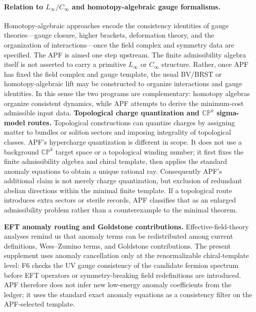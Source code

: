 \documentclass[11pt]{article}
\theoremstyle{definition}
\begin{document}
\paragraph{Relation to $L_\infty/C_\infty$ and homotopy-algebraic gauge formalisms.}\label{par:homotopy_algebra}
Homotopy-algebraic approaches encode the consistency identities of gauge
theories---gauge closure, higher brackets, deformation theory, and the
organization of interactions---once the field complex and symmetry data are
specified.  The APF is aimed one step upstream.  The finite admissibility algebra itself
is not asserted to carry a primitive $L_\infty$ or $C_\infty$ structure.
Rather, once APF has fixed the field complex and gauge template, the usual
BV/BRST or homotopy-algebraic lift may be constructed to organize interactions
and gauge identities.  In this sense the two programs are complementary:
homotopy algebras organize consistent dynamics, while APF attempts to derive
the minimum-cost admissible input data.
\smallskip\noindent\textbf{Topological charge quantization and $\mathbb{CP}^k$ sigma-model routes.}\quad
Topological constructions can quantize charges by assigning matter to bundles or soliton sectors and imposing integrality of topological classes.  APF's hypercharge quantization is different in scope.  It does not use a background $\mathbb{CP}^k$ target space or a topological winding number; it first fixes the finite admissibility algebra and chiral template, then applies the standard anomaly equations to obtain a unique rational ray.  Consequently APF's additional claim is not merely charge quantization, but exclusion of redundant abelian directions within the minimal finite template.  If a topological route introduces extra sectors or sterile records, APF classifies that as an enlarged admissibility problem rather than a counterexample to the minimal theorem.

\smallskip\noindent\textbf{EFT anomaly routing and Goldstone contributions.}\quad
Effective-field-theory analyses remind us that anomaly terms can be redistributed among current definitions, Wess--Zumino terms, and Goldstone contributions.  The present supplement uses anomaly cancellation only at the renormalizable chiral-template level: F6 checks the UV gauge consistency of the candidate fermion spectrum before EFT operators or symmetry-breaking field redefinitions are introduced.  APF therefore does not infer new low-energy anomaly coefficients from the ledger; it uses the standard exact anomaly equations as a consistency filter on the APF-selected template.
\end{document}
